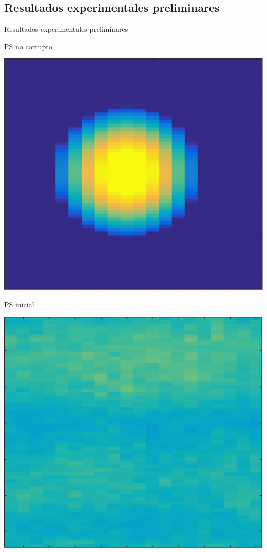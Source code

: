 \documentclass[fleqn,10pt]{beamer}
\begin{document}
\subsection[Resultados]{Resultados experimentales preliminares}
\begin{frame}{Resultados experimentales preliminares}		
	\begin{minipage}{0.22\linewidth}
		\begin{center}
		{\small PS no corrupto 
			
		\includegraphics[width=0.8\linewidth]{AAUgraphics/pt4/exp_psf_clean}
		\vfill
		
		PS inicial
		
		\includegraphics[width=0.8\linewidth]{AAUgraphics/pt4/exp_psf_init}
		\vfill
		\pause
		
}
\end{center}
\end{minipage}
\end{frame}
\end{document}

